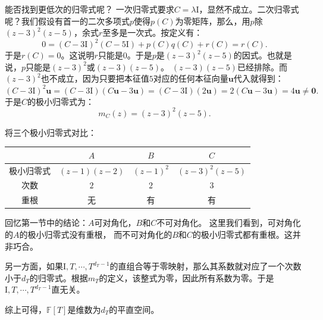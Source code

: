 \documentclass[12pt,UTF8]{ctexbook}
\begin{document}
能否找到更低次的归零式呢？
一次归零式要求$C = \lambda\mathrm{I}$，显然不成立。二次归零式呢？我们假设有首一的二次多项式$p$使得$p(C) $为零矩阵，那么，用$p$除$(z-3)^2(z-5)$，余式$r$至多是一次式。按定义有：
$$ 0 = (C-3\mathrm{I})^2(C-5\mathrm{I}) + p(C)q(C) + r(C) = r(C).$$
于是$r(C) = 0$。这说明$r$只能是$0$。于是$p$是$(z-3)^2(z-5)$的因式。也就是说，$p$只能是$(z-3)^2$或$(z-3)(z-5)$。
$(z-3)(z-5)$已经排除。而$(z-3)^2$也不成立，因为只要把本征值$5$对应的任何本征向量$\mathbf{u}$代入就得到：
$$ 
(C - 3\mathrm{I})^2\mathbf{u} = (C - 3\mathrm{I})(C\mathbf{u} - 3\mathbf{u}) = (C - 3\mathrm{I})(2\mathbf{u}) = 2(C\mathbf{u} - 3\mathbf{u}) = 4\mathbf{u} \neq \mathbf{0}.
$$
于是$C$的极小归零式为：
$$
m_C(z) = (z-3)^2(z-5).
$$

将三个极小归零式对比：
\begin{center}
\begin{tabular}{|c|c|c|c|}
\hline
 & $A$ & $B$ & $C$ \\
\hline
极小归零式 & $(z-1)(z-2)$ & \phantom{.2)}$(z-1)^2$\phantom{.2)} & $(z-3)^2(z-5)$ \\
次数 & $2$ & $2$ & $3$ \\
重根 & 无 & 有 & 有 \\
\hline
\end{tabular}
\end{center}

回忆第一节中的结论：$A$可对角化，$B$和$C$不可对角化。
这里我们看到，可对角化的$A$的极小归零式没有重根，
而不可对角化的$B$和$C$的极小归零式都有重根。这并非巧合。

另一方面，如果$\mathrm{I}, T, \cdots , T^{d_T - 1}$的直组合等于零映射，那么其系数就对应了一个次数小于$d_T$的归零式。根据$m_T$的定义，该整式为零，因此所有系数为零。于是$\mathrm{I}, T , \cdots , T^{d_T - 1}$直无关。

综上可得，$\mathbb{F}[T]$是维数为$d_T$的平直空间。
\end{document}
